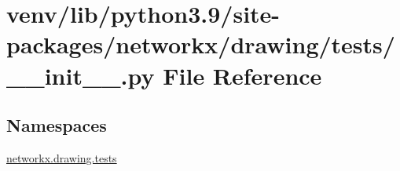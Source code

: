 \hypertarget{venv_2lib_2python3_89_2site-packages_2networkx_2drawing_2tests_2____init_____8py}{}\section{venv/lib/python3.9/site-\/packages/networkx/drawing/tests/\+\_\+\+\_\+init\+\_\+\+\_\+.py File Reference}
\label{venv_2lib_2python3_89_2site-packages_2networkx_2drawing_2tests_2____init_____8py}
\subsection*{Namespaces}
\begin{DoxyCompactItemize}
\item 
 \hyperlink{namespacenetworkx_1_1drawing_1_1tests}{networkx.\+drawing.\+tests}
\end{DoxyCompactItemize}
